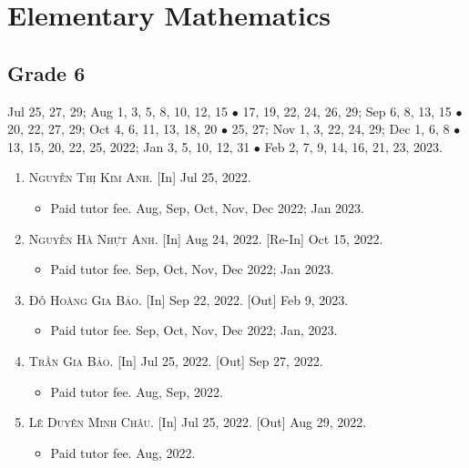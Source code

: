 \documentclass{article}
\numberwithin{equation}{section}
\begin{document}

\section{Elementary Mathematics}

\subsection{Grade 6}
Jul 25, 27, 29; Aug 1, 3, 5, 8, 10, 12, 15 $\bullet$ 17, 19, 22, 24, 26, 29; Sep 6, 8, 13, 15 $\bullet$ 20, 22, 27, 29; Oct 4, 6, 11, 13, 18, 20 $\bullet$ 25, 27; Nov 1, 3, 22, 24, 29; Dec 1, 6, 8 $\bullet$ 13, 15, 20, 22, 25, 2022; Jan 3, 5, 10, 12, 31 $\bullet$ Feb 2, 7, 9, 14, 16, 21, 23, 2023.
\begin{enumerate}
	\item \textsc{Nguyễn Thị Kim Anh.} \textsf{[In]} Jul 25, 2022.
	\begin{itemize}
		\item \textsf{Paid tutor fee.} Aug, Sep, Oct, Nov, Dec 2022; Jan 2023.
	\end{itemize}
	\item \textsc{Nguyễn Hà Nhựt Anh.} \textsf{[In]} Aug 24, 2022. \textsf{[Re-In]} Oct 15, 2022.
	\begin{itemize}
		\item \textsf{Paid tutor fee.} Sep, Oct, Nov, Dec 2022; Jan 2023.
	\end{itemize}
	\item \textsc{Đỗ Hoàng Gia Bảo.} \textsf{[In]} Sep 22, 2022. \textsf{[Out]} Feb 9, 2023.
	\begin{itemize}
		\item \textsf{Paid tutor fee.} Sep, Oct, Nov, Dec 2022; Jan, 2023.
	\end{itemize}
	\item \textsc{Trần Gia Bảo.} \textsf{[In]} Jul 25, 2022. \textsf{[Out]} Sep 27, 2022.
	\begin{itemize}
		\item \textsf{Paid tutor fee.} Aug, Sep, 2022.
	\end{itemize}
	\item \textsc{Lê Duyên Minh Châu.} \textsf{[In]} Jul 25, 2022. \textsf{[Out]} Aug 29, 2022.
	\begin{itemize}
		\item \textsf{Paid tutor fee.} Aug, 2022.
	\end{itemize}

\end{enumerate}
\end{document}
